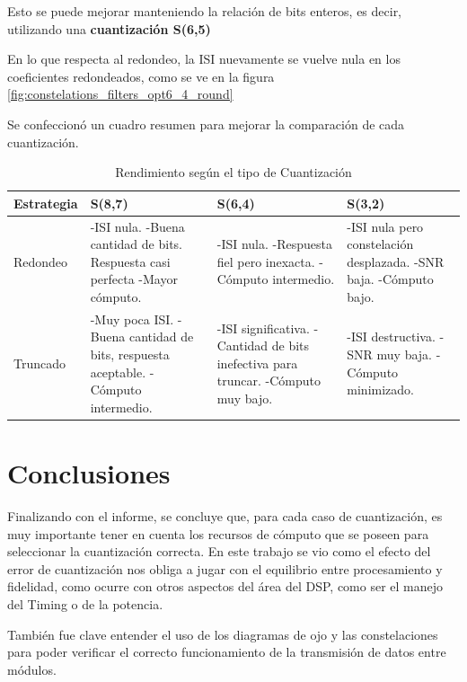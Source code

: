 \documentclass[12pt, a4paper]{article}
\begin{document}
Esto se puede mejorar manteniendo la relación de bits enteros, es decir, utilizando una \textbf{cuantización S(6,5)}

En lo que respecta al redondeo, la ISI nuevamente se vuelve nula en los coeficientes redondeados, como se ve en la figura \ref{fig:constelations_filters_opt6_4_round}

Se confeccionó un cuadro resumen para mejorar la comparación de cada cuantización.

\begin{table}[h]
    \centering
    \caption{Rendimiento según el tipo de Cuantización}
    \label{tab:tabla_cuantizaciones}
    \begin{tabularx}{\textwidth}{lXXX}
        \toprule
        \textbf{Estrategia} & \textbf{S(8,7)} & \textbf{S(6,4)} & \textbf{S(3,2)} \\
        \midrule
        Redondeo &
        -ISI nula. \newline
        -Buena cantidad de bits. Respuesta casi perfecta \newline
        -Mayor cómputo.
        &
        -ISI nula. \newline
        -Respuesta fiel pero inexacta. \newline
        -Cómputo intermedio.
        &
        -ISI nula pero constelación desplazada. \newline
        -SNR baja. \newline
        -Cómputo bajo.
        \\
        \midrule
        Truncado &
        -Muy poca ISI. \newline
        -Buena cantidad de bits, respuesta aceptable. \newline
        -Cómputo intermedio.
        &
        -ISI significativa. \newline
        -Cantidad de bits inefectiva para truncar. \newline
        -Cómputo muy bajo.
        &
        -ISI destructiva. \newline
        -SNR muy baja. \newline
        -Cómputo minimizado.
        \\
        \bottomrule
    \end{tabularx}
\end{table}
\newpage


\section{Conclusiones}

Finalizando con el informe, se concluye que, para cada caso de cuantización, es muy importante
tener en cuenta los recursos de cómputo que se poseen para seleccionar la
cuantización correcta.
En este trabajo se vio como el efecto del error de cuantización nos obliga a jugar con el
equilibrio entre procesamiento y fidelidad, como ocurre con otros aspectos del área del DSP,
como ser el manejo del Timing o de la potencia.

También fue clave entender el uso de los diagramas de ojo y
las constelaciones para poder verificar el correcto funcionamiento de la transmisión de datos entre
módulos.
\end{document}
